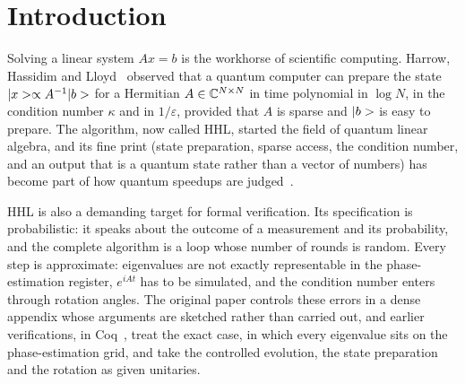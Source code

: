 \section{Introduction}\label{sec:intro}

Solving a linear system $Ax=b$ is the workhorse of scientific computing. Harrow, Hassidim and
Lloyd~\cite{hhl2009} observed that a quantum computer can prepare the state $|x>\propto A^{-1}|b>$ for a Hermitian $A\in\mathbb{C}^{N\times N}$ in time polynomial in $\log N$, in the condition number
$\kappa$ and in $1/\varepsilon$, provided that $A$ is sparse and $|b>$ is easy to prepare. The
algorithm, now called HHL, started the field of quantum linear algebra, and its fine print (state
preparation, sparse access, the condition number, and an output that is a quantum state rather than
a vector of numbers) has become part of how quantum speedups are judged~\cite{aaronson2015}.

HHL is also a demanding target for formal verification. Its specification is probabilistic: it
speaks about the outcome of a measurement and its probability, and the complete algorithm is a loop
whose number of rounds is random. Every step is approximate: eigenvalues are not exactly
representable in the phase-estimation register, $e^{iAt}$ has to be simulated, and the condition
number enters through rotation angles. The original paper controls these errors in a dense appendix
whose arguments are sketched rather than carried out, and earlier verifications, in
Coq~\cite{zhou2023coqq,wu2024local}, treat the exact case, in which every eigenvalue sits on the
phase-estimation grid, and take the controlled evolution, the state preparation and the rotation as
given unitaries.


